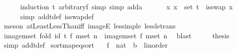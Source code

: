 \begin{isabellebody}
\ \ \ \ \isamarkupfalse%
\ {\isacharparenleft}{\kern0pt}induction\ t\ arbitrary{\isacharcolon}{\kern0pt}f{\isacharcomma}{\kern0pt}\ simp{\isacharcomma}{\kern0pt}\ simp\ add{\isacharcolon}{\kern0pt}a{\isacharparenright}{\kern0pt}\ \isanewline
\ \ \isamarkupfalse%
\ \isamarkupfalse%
\ {\isachardoublequoteopen}{\isasymAnd}x{\isachardot}{\kern0pt}\ x\ {\isasymin}\ set\ t\ {\isasymLongrightarrow}\ is{\isacharunderscore}{\kern0pt}swap\ x{\isachardoublequoteclose}\ \isanewline
\ \ \ \ \isamarkupfalse%
\ {\isacharparenleft}{\kern0pt}simp\ add{\isacharcolon}{\kern0pt}t{\isacharunderscore}{\kern0pt}def\ is{\isacharunderscore}{\kern0pt}swap{\isacharunderscore}{\kern0pt}def{\isacharparenright}{\kern0pt}\ \isanewline
\ \ \ \ \isamarkupfalse%
\ {\isacharparenleft}{\kern0pt}meson\ atLeastLessThan{\isacharunderscore}{\kern0pt}iff\ imageE\ less{\isacharunderscore}{\kern0pt}imp{\isacharunderscore}{\kern0pt}le\ less{\isacharunderscore}{\kern0pt}le{\isacharunderscore}{\kern0pt}trans{\isacharparenright}{\kern0pt}\ \ \isanewline
\ \ \isamarkupfalse%
\ \isamarkupfalse%
\ {\isachardoublequoteopen}image{\isacharunderscore}{\kern0pt}mset\ {\isacharparenleft}{\kern0pt}fold\ id\ t\ f{\isacharparenright}{\kern0pt}\ {\isacharparenleft}{\kern0pt}mset\ {\isacharbrackleft}{\kern0pt}{}{\isachardot}{\kern0pt}{\isachardot}{\kern0pt}{\isacharless}{\kern0pt}n{\isacharbrackright}{\kern0pt}{\isacharparenright}{\kern0pt}\ {\isacharequal}{\kern0pt}\ image{\isacharunderscore}{\kern0pt}mset\ f\ {\isacharparenleft}{\kern0pt}mset\ {\isacharbrackleft}{\kern0pt}{}{\isachardot}{\kern0pt}{\isachardot}{\kern0pt}{\isacharless}{\kern0pt}n{\isacharbrackright}{\kern0pt}{\isacharparenright}{\kern0pt}{\isachardoublequoteclose}\ \isamarkupfalse%
\ blast\isanewline
\ \ \isamarkupfalse%
\ \isamarkupfalse%
\ {\isacharquery}{\kern0pt}thesis\ \isamarkupfalse%
\ {\isacharparenleft}{\kern0pt}simp\ add{\isacharcolon}{\kern0pt}t{\isacharunderscore}{\kern0pt}def{\isacharparenright}{\kern0pt}\isanewline
{}\isamarkupfalse%
%
\endisatagproof
{\isafoldproof}%
%
\isadelimproof
\isanewline
%
\endisadelimproof
\isanewline
{}\isamarkupfalse%
\ sort{\isacharunderscore}{\kern0pt}map{\isacharunderscore}{\kern0pt}eq{\isacharunderscore}{\kern0pt}sort{\isacharcolon}{\kern0pt}\isanewline
\ \ \ f\ {\isacharcolon}{\kern0pt}{\isacharcolon}{\kern0pt}\ {\isachardoublequoteopen}nat\ {\isasymRightarrow}\ {\isacharparenleft}{\kern0pt}{\isacharprime}{\kern0pt}b\ {\isacharcolon}{\kern0pt}{\isacharcolon}{\kern0pt}\ linorder{\isacharparenright}{\kern0pt}{\isachardoublequoteclose}\isanewline

\end{isabellebody}
